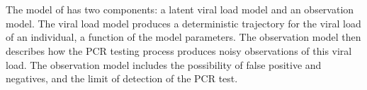 \documentclass[thesis.tex]{subfiles}
\begin{document}

\section{\texorpdfstring{\textcite{hakkiOnset}}{Hakki \etal (2022)}} \label{ATACCC:sec:hakki}

The model of \textcite{hakkiOnset} has two components: a latent viral load model and an observation model.
The viral load model produces a deterministic trajectory for the viral load of an individual, a function of the model parameters.
The observation model then describes how the PCR testing process produces noisy observations of this viral load.
The observation model includes the possibility of false positive and negatives, and the limit of detection of the PCR test.
\end{document}
